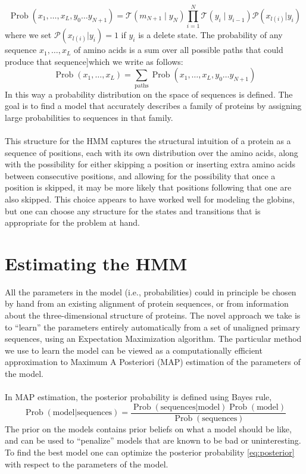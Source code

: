 \begin{equation}\label{eq:p_seq_path}
\operatorname{Prob}(x_1, \dots, x_L, y_0 \dots y_{N+1})= \mathcal{T}\left(m_{N+1} \mid y_{N}\right) \prod_{i=1}^{N} \mathcal{T}\left(y_{i} \mid y_{i-1}\right) \mathcal{P} (x_{l(i)}|y_i)
\end{equation}
where we set $\mathcal{P} (x_{l(i)}|y_i)=1$ if $y_i$ is a delete state. The probability of any sequence $x_1, \dots, x_L$ of amino acids is a sum over all possible paths that could produce that sequence]which we write as follows:
\begin{equation}\label{eq:p_seq}
\operatorname{Prob}(x_1, \dots, x_L)= \sum_{\text {paths}} \operatorname{Prob}(x_1, \dots, x_L, y_0 \dots y_{N+1})
\end{equation}
\noindent
In this way a probability distribution on the space of sequences is defined. The goal is to find a model that accurately describes a family of proteins by assigning large probabilities to sequences in that family.
\\
\\
\noindent
This structure for the HMM captures the structural intuition of a protein as a sequence of positions, each with its own distribution over the amino acids, along with the possibility for either skipping a position or inserting extra amino acids between consecutive positions, and allowing for the possibility that once a position is skipped, it may be more likely that positions following that one are also skipped. This choice appears to have worked well for modeling the globins,  but one can choose any structure for the states and transitions that is appropriate for the problem at hand.

\section{Estimating the HMM}
All the parameters in the model (i.e., probabilities) could in principle be chosen by hand from an existing alignment of protein sequences, or from information about the three-dimensional structure of proteins. The novel approach we take is to “learn” the parameters entirely automatically from a set of unaligned primary sequences, using an Expectation Maximization algorithm. The particular method we use to learn the model can be viewed as a computationally efficient approximation to Maximum A Posteriori (MAP) estimation of the parameters of the model.
\\
\\
\noindent
In MAP estimation,  the posterior probability is defined using Bayes rule,
\begin{equation} \label{eq:posterior}
\operatorname{Prob}(\text{model|sequences}) = \frac{\operatorname{Prob}(\text{sequences|model})\operatorname{Prob}(\text{model})}{\operatorname{Prob}(\text{sequences})}
\end{equation}
The prior on the models contains prior beliefs on what a model should be like, and can be used to “penalize” models that are known to be bad or uninteresting. To find the best model one can optimize the posterior probability \ref{eq:posterior} with respect to the parameters of the model.

